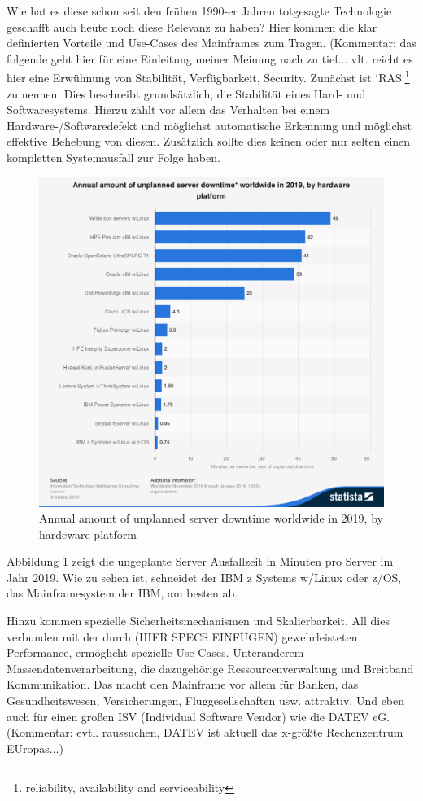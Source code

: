 Wie hat es diese schon seit den frühen 1990-er Jahren totgesagte Technologie geschafft auch heute noch diese Relevanz zu haben?
Hier kommen die klar definierten Vorteile und Use-Cases des Mainframes zum Tragen.
(Kommentar: das folgende geht hier für eine Einleitung meiner Meinung nach zu tief... vlt. reicht es hier eine Erwühnung von Stabilität, Verfügbarkeit, Security. 
Zunächst ist `RAS`\footnote{reliability, availability and serviceability} zu nennen.
Dies beschreibt grundsätzlich, die Stabilität eines Hard- und Softwaresystems.
Hierzu zählt vor allem das Verhalten bei einem Hardware-/Softwaredefekt und möglichst automatische Erkennung und möglichst effektive Behebung von diesen.
Zusätzlich sollte dies keinen oder nur selten einen kompletten Systemausfall zur Folge haben.
\begin{figure}[h]
	\centering
	\includegraphics[width=\textwidth]{figures/statistic_id515285_unplanned-server-downtime-globally-2019-by-hardware-platform.png}
	\caption{Annual amount of unplanned server downtime worldwide in 2019, by hardeware platform}
	\label{fig:serverdowntime}
\end{figure}
Abbildung \ref{fig:serverdowntime} zeigt die ungeplante Server Ausfallzeit in Minuten pro Server im Jahr 2019.
Wie zu sehen ist, schneidet der IBM z Systems w/Linux oder z/OS, das Mainframesystem der IBM, am besten ab.


Hinzu kommen spezielle Sicherheitsmechanismen und Skalierbarkeit.
All dies verbunden mit der durch (HIER SPECS EINFÜGEN) gewehrleisteten Performance, ermöglicht spezielle Use-Cases.
Unteranderem Massendatenverarbeitung, die dazugehörige Ressourcenverwaltung und Breitband Kommunikation.
Das macht den Mainframe vor allem für Banken, das Gesundheitswesen, Versicherungen, Fluggesellschaften usw. attraktiv.
Und eben auch für einen großen ISV (Individual Software Vendor) wie die DATEV eG. (Kommentar: evtl. raussuchen, DATEV ist aktuell das 
x-größte Rechenzentrum EUropas...)
\cite{IBM.2014}

